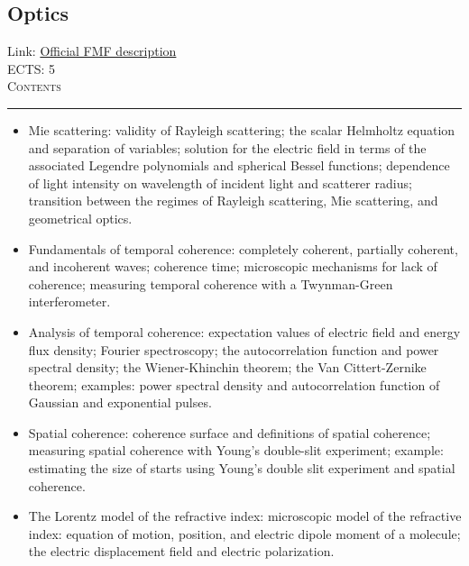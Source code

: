 \documentclass[11pt, a4paper]{article}
\newenvironment{course}[3]{
\subsection{#1}%
Link: \href{#2}{Official FMF description}\\%
ECTS: #3%
\vspace{1ex}
\\
{\large \textsc{Contents}}\\[-0.9ex]%
\rule{\textwidth}{0.5pt}
\vspace{-3ex}
}
{}
\newenvironment{chapter}[1]{
\begin{tcolorbox}[title=#1, breakable]
}
{\end{tcolorbox}}
\begin{document}
\begin{course}{Optics}{https://www.fmf.uni-lj.si/en/study-physics/programmes/1fiz/2020/7000777/courses/1165/}{5}
\begin{chapter}{Optical scattering}
\begin{itemize}
            \item Mie scattering: validity of Rayleigh scattering; the scalar Helmholtz equation and separation of variables; solution for the electric field in terms of the associated Legendre polynomials and spherical Bessel functions; dependence of light intensity on wavelength of incident light and scatterer radius; transition between the regimes of Rayleigh scattering, Mie scattering, and geometrical optics.
        
        \end{itemize}
    \end{chapter}

    \begin{chapter}{Coherence}
        \begin{itemize}
        
            \item Fundamentals of temporal coherence: completely coherent, partially coherent, and incoherent waves; coherence time; microscopic mechanisms for lack of coherence; measuring temporal coherence with a Twynman-Green interferometer.

            \item Analysis of temporal coherence: expectation values of electric field and energy flux density; Fourier spectroscopy; the autocorrelation function and power spectral density; the Wiener-Khinchin theorem; the Van Cittert-Zernike theorem; examples: power spectral density and autocorrelation function of Gaussian and exponential pulses.

            \item Spatial coherence: coherence surface and definitions of spatial coherence; measuring spatial coherence with Young's double-slit experiment; example: estimating the size of starts using Young's double slit experiment and spatial coherence.
        
        \end{itemize}
    \end{chapter}

    \begin{chapter}{The refractive index}
        \begin{itemize}
        
            \item The Lorentz model of the refractive index: microscopic model of the refractive index: equation of motion, position, and electric dipole moment of a molecule; the electric displacement field and electric polarization.


\end{itemize}
\end{chapter}
\end{course}
\end{document}
